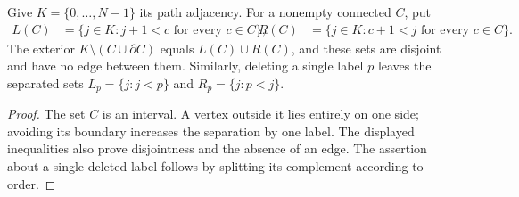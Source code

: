 \begin{lemma}
    \label{thm:cluster_path_exterior_sides}
    \leanok

    Give $K=\{0,\ldots,N-1\}$ its path adjacency. For a nonempty
    connected $C$, put
    \begin{align}
        L(C)&=\{j\in K:j+1<c\text{ for every }c\in C\},
        &R(C)&=\{j\in K:c+1<j\text{ for every }c\in C\}.
        \label{eq:cluster_path_exterior_sides}
    \end{align}
    The exterior $K\setminus(C\cup\partial C)$ equals $L(C)\cup R(C)$,
    and these sets are disjoint and have no edge between them.
    Similarly, deleting a single label $p$ leaves the separated sets
    $L_p=\{j:j<p\}$ and $R_p=\{j:p<j\}$.
\end{lemma}
\begin{proof}\leanok
    The set $C$ is an interval. A vertex outside it lies entirely
    on one side; avoiding its boundary increases the separation by
    one label. The displayed inequalities also prove disjointness
    and the absence of an edge. The assertion about a single deleted
    label follows by splitting its complement according to order.
\end{proof}

